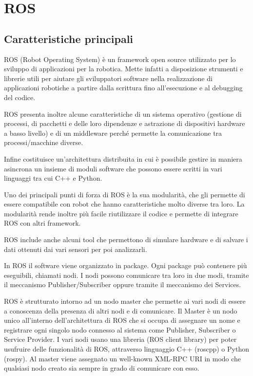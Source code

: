 \documentclass[Lau, binding=0.6cm, oneside]{sapthesis}
\begin{document}
\section{ROS}
\subsection{Caratteristiche principali}
ROS (Robot Operating System) è un framework open source utilizzato per lo sviluppo di applicazioni per la robotica.
Mette infatti a disposizione strumenti e librerie utili per aiutare gli sviluppatori software nella realizzazione di applicazioni robotiche a partire dalla scrittura fino all’esecuzione e al debugging del codice.

ROS presenta inoltre alcune caratteristiche di un sistema operativo (gestione di processi, di pacchetti e delle loro dipendenze e astrazione di dispositivi hardware a basso livello) e di un middleware perché permette la comunicazione tra processi/macchine diverse.

Infine costituisce un’architettura distribuita in cui è possibile gestire in maniera asincrona un insieme di moduli software che possono essere scritti in vari linguaggi tra cui C++ e Python.

Uno dei principali punti di forza di ROS è la sua modularità, che gli permette di essere compatibile con robot che hanno caratteristiche molto diverse tra loro.
La modularità rende inoltre più facile riutilizzare il codice e permette di integrare ROS con altri framework.

ROS include anche alcuni tool che permettono di simulare hardware e di salvare i dati ottenuti dai vari sensori per poi analizzarli.

In ROS il software viene organizzato in package. Ogni package può contenere più eseguibili, chiamati nodi.
I nodi possono comunicare tra loro in due modi, tramite il meccanismo Publisher/Subscriber oppure tramite il meccanismo dei Services.

ROS è strutturato intorno ad un nodo master che permette ai vari nodi di essere a conoscenza della presenza di altri nodi e di comunicare.
Il Master è un nodo unico all’interno dell’architettura di ROS che si occupa di assegnare un nome e registrare ogni singolo nodo connesso al sistema come Publisher, Subscriber o Service Provider.
I vari nodi usano una libreria (ROS client library) per poter usufruire delle funzionalità di ROS, attraverso linguaggio C++ (roscpp) o Python (rospy).
Al master viene assegnato un well-known XML-RPC URI in modo che qualsiasi nodo creato sia sempre in grado di comunicare con esso.
\end{document}
